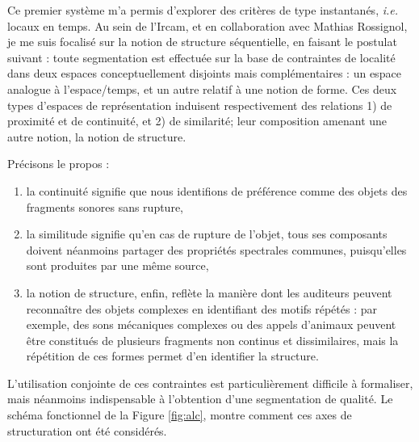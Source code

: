   Ce premier système m'a permis d'explorer des critères de type instantanés, \textit{i.e.} locaux en temps. Au sein de l'Ircam, et en collaboration avec Mathias Rossignol, je me suis focalisé sur la notion de structure séquentielle, en faisant le postulat suivant : toute segmentation est effectuée sur la base de contraintes de localité dans deux espaces conceptuellement disjoints mais complémentaires : un espace analogue à l'espace/temps, et un autre relatif à une notion de forme. Ces deux types d'espaces de représentation induisent respectivement des relations 1) de proximité et de continuité, et 2) de similarité; leur composition amenant une autre notion, la notion de structure.

  Précisons le propos : %

  \begin{enumerate}
    \item la continuité signifie que nous identifions de préférence comme des objets des fragments sonores sans rupture,
    \item la similitude signifie qu'en cas de rupture de l'objet, tous ses composants doivent néanmoins partager des propriétés spectrales communes, puisqu'elles sont produites par une même source,
    \item la notion de  structure, enfin, reflète la manière dont les auditeurs peuvent reconnaître des objets complexes en identifiant des motifs répétés : par exemple, des sons mécaniques complexes ou des appels d'animaux peuvent être constitués de plusieurs fragments non continus et dissimilaires, mais la répétition de ces formes permet d'en identifier la structure.
  \end{enumerate}

  L'utilisation conjointe de ces contraintes est particulièrement difficile à formaliser, mais néanmoins indispensable à l'obtention d'une segmentation de qualité. Le schéma fonctionnel de la Figure \ref{fig:alc}, montre comment ces axes de structuration ont été considérés.


